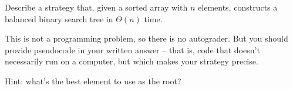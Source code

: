 \begin{prob}

    Describe a strategy that, given a sorted array with $n$ elements,
    constructs a balanced binary search tree in $\Theta(n)$ time. 

    This is not a programming problem, so there is no autograder. But you should
    provide pseudocode in your written answer -- that is, code that doesn't
    necessarily run on a computer, but which makes your strategy precise.

    Hint: what's the best element to use as the root?

    \begin{soln}
    \end{soln}

\end{prob}
